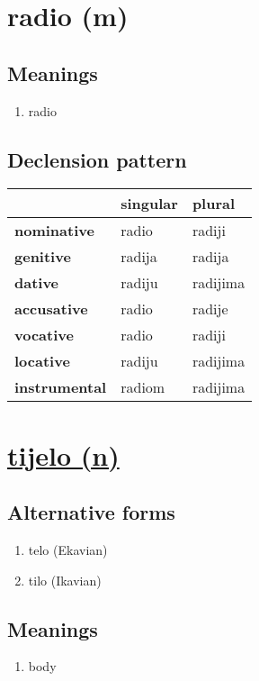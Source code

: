 \filbreak
\section{radio (m)}
\subsection*{Meanings}
\begin{enumerate}
\item radio
\end{enumerate}
\subsection*{Declension pattern}
\begin{tabularx}{\linewidth}{Xll}
\toprule
{} & singular &    plural \\
\midrule
\textbf{nominative  } &    radio &    radiji \\
\textbf{genitive    } &   radija &    radija \\
\textbf{dative      } &   radiju &  radijima \\
\textbf{accusative  } &    radio &    radije \\
\textbf{vocative    } &    radio &    radiji \\
\textbf{locative    } &   radiju &  radijima \\
\textbf{instrumental} &   radiom &  radijima \\
\bottomrule
\end{tabularx}

\filbreak
\section{\underline{tijelo (n)}}
\subsection*{Alternative forms}
\begin{enumerate}
\item telo (Ekavian)
\item tilo (Ikavian)
\end{enumerate}
\subsection*{Meanings}
\begin{enumerate}
\item body
\end{enumerate}
